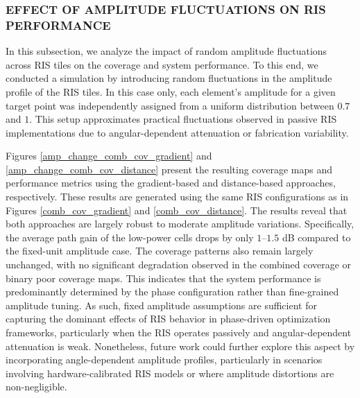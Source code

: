 \documentclass{IEEEoj}
\begin{document}
\subsubsection{EFFECT OF AMPLITUDE FLUCTUATIONS ON RIS PERFORMANCE}
In this subsection, we analyze the impact of random amplitude fluctuations across RIS tiles on the coverage and system performance. To this end, we conducted a simulation by introducing random fluctuations in the amplitude profile of the RIS tiles. In this case only, each element’s amplitude for a given target point was independently assigned from a uniform distribution between $0.7$ and $1$. This setup approximates practical fluctuations observed in passive RIS implementations due to angular-dependent attenuation or fabrication variability.

Figures \ref{amp_change_comb_cov_gradient} and \ref{amp_change_comb_cov_distance} present the resulting coverage maps and performance metrics using the gradient-based and distance-based approaches, respectively. These results are generated using the same RIS configurations as in Figures \ref{comb_cov_gradient} and \ref{comb_cov_distance}. The results reveal that both approaches are largely robust to moderate amplitude variations. Specifically, the average path gain of the low-power cells drops by only $1$–$1.5$ dB compared to the fixed-unit amplitude case. The coverage patterns also remain largely unchanged, with no significant degradation observed in the combined coverage or binary poor coverage maps. This indicates that the system performance is predominantly determined by the phase configuration rather than fine-grained amplitude tuning. As such, fixed amplitude assumptions are sufficient for capturing the dominant effects of RIS behavior in phase-driven optimization frameworks, particularly when the RIS operates passively and angular-dependent attenuation is weak. Nonetheless, future work could further explore this aspect by incorporating angle-dependent amplitude profiles, particularly in scenarios involving hardware-calibrated RIS models or where amplitude distortions are non-negligible.
\end{document}
